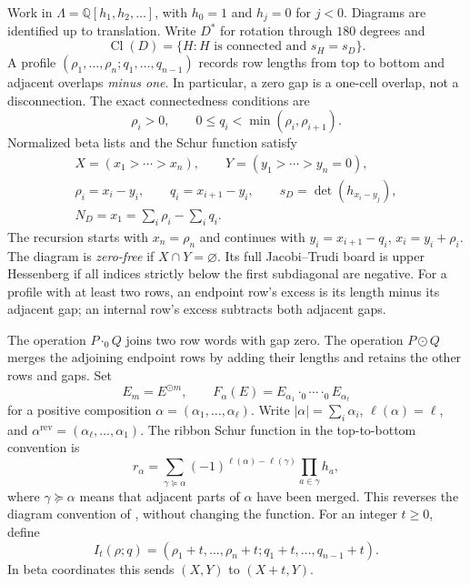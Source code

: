 \documentclass[11pt,a4paper]{amsart}
\numberwithin{equation}{section}
\theoremstyle{plain}
\theoremstyle{definition}
\begin{document}
Work in \(\Lambda=\mathbb Q[h_1,h_2,\ldots]\), with \(h_0=1\)
and \(h_j=0\) for \(j<0\).  Diagrams are identified up to
translation.  Write \(D^*\) for rotation through \(180\) degrees and
\[
 \operatorname{Cl}(D)=\{H:H\text{ is connected and }s_H=s_D\}.
\]
A profile \((\rho_1,\ldots,\rho_n;q_1,\ldots,q_{n-1})\)
records row lengths from top to bottom and adjacent overlaps \emph{minus
one}.  In particular, a zero gap is a one-cell overlap, not a
disconnection.  The exact connectedness conditions are
\[
 \rho_i>0,\qquad 0\le q_i<\min(\rho_i,\rho_{i+1}).
\]
Normalized beta lists and the Schur function satisfy
\begin{equation}\label{eq:betas}
 \begin{gathered}
 X=(x_1>\cdots>x_n),\qquad Y=(y_1>\cdots>y_n=0),\\
 \rho_i=x_i-y_i,\qquad q_i=x_{i+1}-y_i,
 \qquad s_D=\det(h_{x_i-y_j}),\\
 N_D=x_1=\sum_i\rho_i-\sum_iq_i.
 \end{gathered}
\end{equation}
The recursion starts with \(x_n=\rho_n\) and continues with
\(y_i=x_{i+1}-q_i\), \(x_i=y_i+\rho_i\).
The diagram is \emph{zero-free} if \(X\cap Y=\varnothing\).
Its full Jacobi--Trudi board is upper Hessenberg if all indices strictly
below the first subdiagonal are negative.  For a profile with at least
two rows, an endpoint row's excess is its length minus its adjacent gap;
an internal row's excess subtracts both adjacent gaps.

The operation \(P\cdot_0 Q\) joins two row words with gap zero.
The operation \(P\odot Q\) merges the adjoining endpoint rows by
adding their lengths and retains the other rows and gaps.  Set
\[
 E_m=E^{\odot m},\qquad
 F_\alpha(E)=E_{\alpha_1}\cdot_0\cdots\cdot_0E_{\alpha_\ell}
\]
for a positive composition \(\alpha=(\alpha_1,\ldots,\alpha_\ell)\).
Write \(|\alpha|=\sum_i\alpha_i\), \(\ell(\alpha)=\ell\),
and \(\alpha^{\mathrm{rev}}=(\alpha_\ell,\ldots,\alpha_1)\).
The ribbon Schur function in the top-to-bottom convention is
\begin{equation}\label{eq:ribbon}
 r_\alpha=\sum_{\gamma\succeq\alpha}
 (-1)^{\ell(\alpha)-\ell(\gamma)}\prod_{a\in\gamma}h_a,
\end{equation}
where \(\gamma\succeq\alpha\) means that adjacent parts of
\(\alpha\) have been merged.  This reverses the diagram convention
of \cite{Billera2006DecomposableCompositions}, without changing the
function.  For an integer \(t\ge0\), define
\begin{equation}\label{eq:inflation}
 I_t(\rho;q)=(\rho_1+t,\ldots,\rho_n+t;q_1+t,\ldots,q_{n-1}+t).
\end{equation}
In beta coordinates this sends \((X,Y)\) to \((X+t,Y)\).
\end{document}
